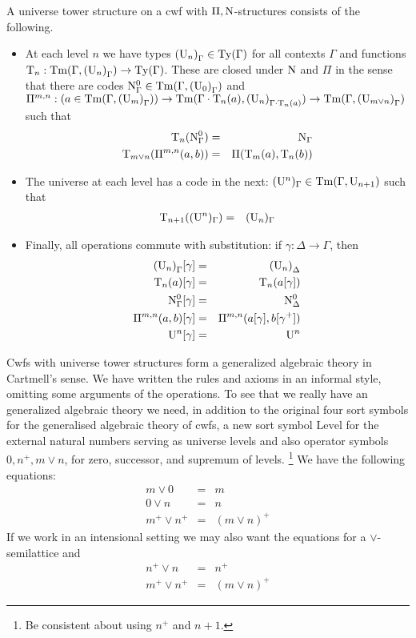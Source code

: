 \documentclass{lmcs}
\newcommand{\Ta}{\mathrm{T}}
\newcommand{\Tan}{\Ta_n}
\newcommand{\Un}{\U_n}
\newcommand{\Level}{\mathrm{Level}}
\begin{document}
A universe tower structure on a cwf with $\Pi, \mathrm{N}$-structures consists of the following.
\begin{itemize}
\item 
At each level $n$ we have types ${(\Un)}_\Gamma \in \Ty(\Gamma)$ for all contexts $\Gamma$ and functions $\Ta_n : \Tm(\Gamma,{(\U_n)}_\Gamma) \to \Ty(\Gamma)$. These are closed under $\mathrm{N}$ and $\Pi$ in the sense that there are codes $\mathrm{N}^0_\Gamma \in \mathrm{Tm}(\Gamma,{(\mathrm{U}_0)}_\Gamma)$ and $\Pi^{m,n} : (a \in \Tm(\Gamma,{(\U_m)}_\Gamma)) \to \Tm(\Gamma \cdot \Tan(a),{(\Un)}_{\Gamma \cdot \Tan(a)}
) \to \Tm(\Gamma,{(\U_{m\vee n})}_\Gamma)$ such that 
\begin{eqnarray*}
\Tan(\N^0_\Gamma) &=& \N_\Gamma\\
\Ta_{m \vee n}(\Pi^{m,n}(a,b)) &=& \Pi(\Ta_m(a),\Tan(b))
\end{eqnarray*}
\item
The universe at each level has a code in the next: $(\mathrm{U}^n)_\Gamma \in \mathrm{Tm}(\Gamma,\mathrm{U}_{n+1})$ such that 
\begin{eqnarray*}
\Ta_{n+1}((\U^n)_\Gamma ) &=& (\U_n)_\Gamma
\end{eqnarray*}
\item
Finally, all operations commute with substitution: if $\gamma : \Delta \to \Gamma$, then
\begin{eqnarray*}
{(\Un)}_\Gamma [ \gamma ] &=& {(\Un)}_\Delta\\
\Tan(a) [ \gamma ] &=& \Tan(a[ \gamma ] )\\
\N^0_\Gamma [ \gamma ] &=&\N^0_\Delta\\
\Pi^{m,n}(a,b)[ \gamma ] &=& \Pi^{m,n}(a [ \gamma ], b[ \gamma^+ ])\\
\U^n[\gamma] &=& \U^n
\end{eqnarray*}
\end{itemize}
Cwfs with universe tower structures form a generalized algebraic theory in Cartmell's sense. We have written the rules and axioms in an informal style, omitting some arguments of the operations.
To see that we really have an generalized algebraic theory we need, in addition to the original four sort symbols for the generalised algebraic theory of cwfs, a new sort symbol $\Level$
for the external natural numbers serving as universe levels and also operator symbols $0, n^+, m \vee n$, for zero, successor, and supremum of levels. \footnote{Be consistent about using $n^+$ and $n+1$.} We have the following equations:
\begin{eqnarray*}
m \vee 0 &=&m\\
0 \vee n &=& n\\
m^+ \vee n^+ &=& (m \vee n)^+
\end{eqnarray*}
If we work in an intensional setting we may also want the equations for a $\vee$-semilattice and
\begin{eqnarray*}
n^+ \vee n &=& n^+\\
m^+ \vee n^+ &=& (m \vee n)^+
\end{eqnarray*}
\end{document}
